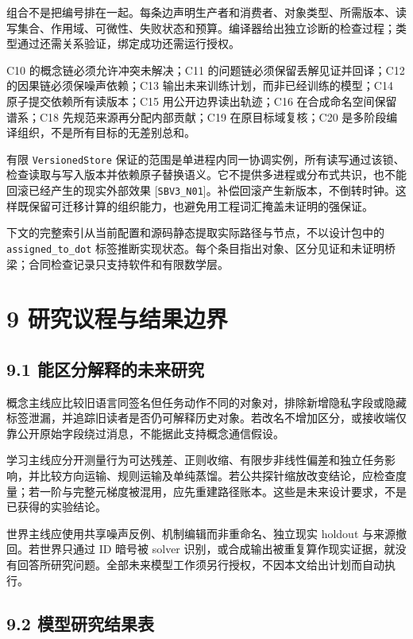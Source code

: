 \documentclass[
  10pt,
]{article}
\begin{document}
组合不是把编号排在一起。每条边声明生产者和消费者、对象类型、所需版本、读写集合、作用域、可微性、失败状态和预算。编译器给出独立诊断的检查过程；类型通过还需关系验证，绑定成功还需运行授权。

C10 的概念链必须允许冲突未解决；C11 的问题链必须保留丢解见证并回译；C12
的因果链必须保噪声依赖；C13 输出未来训练计划，而非已经训练的模型；C14
原子提交依赖所有读版本；C15 用公开边界读出轨迹；C16
在合成命名空间保留谱系；C18 先规范来源再分配内部贡献；C19
在原目标域复核；C20 是多阶段编译组织，不是所有目标的无差别总和。

有限 \nolinkurl{VersionedStore}
保证的范围是单进程内同一协调实例，所有读写通过该锁、检查读取与写入版本并依赖原子替换语义。它不提供多进程或分布式共识，也不能回滚已经产生的现实外部效果
{[}\nolinkurl{SBV3_N01}{]}。补偿回滚产生新版本，不倒转时钟。这样既保留可迁移计算的组织能力，也避免用工程词汇掩盖未证明的强保证。

下文的完整索引从当前配置和源码静态提取实际路径与节点，不以设计包中的
\nolinkurl{assigned_to_dot}
标签推断实现状态。每个条目指出对象、区分见证和未证明桥梁；合同检查记录只支持软件和有限数学层。

\section{9
研究议程与结果边界}\label{ux7814ux7a76ux8baeux7a0bux4e0eux7ed3ux679cux8fb9ux754c}

\subsection{9.1
能区分解释的未来研究}\label{ux80fdux533aux5206ux89e3ux91caux7684ux672aux6765ux7814ux7a76}

概念主线应比较旧语言同签名但任务动作不同的对象对，排除新增隐私字段或隐藏标签泄漏，并追踪旧读者是否仍可解释历史对象。若改名不增加区分，或接收端仅靠公开原始字段绕过消息，不能据此支持概念通信假设。

学习主线应分开测量行为可达残差、正则收缩、有限步非线性偏差和独立任务影响，并比较方向运输、规则运输及单纯蒸馏。若公共探针缩放改变结论，应检查度量；若一阶与完整元梯度被混用，应先重建路径账本。这些是未来设计要求，不是已获得的实验结论。

世界主线应使用共享噪声反例、机制编辑而非重命名、独立现实 holdout
与来源撤回。若世界只通过 ID 暗号被 solver
识别，或合成输出被重复算作现实证据，就没有回答所研究问题。全部未来模型工作须另行授权，不因本文给出计划而自动执行。

\subsection{9.2
模型研究结果表}\label{ux6a21ux578bux7814ux7a76ux7ed3ux679cux8868}
\end{document}

